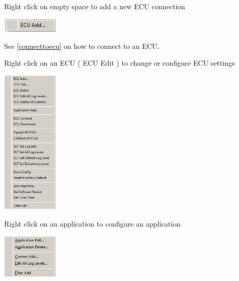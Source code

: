 \documentclass[a4paper,11pt]{article}
\begin{document}
\vspace{0.3cm}

Right click on empty space to add a new ECU connection\linebreak

\vspace{0.1cm}

\includegraphics[width=0.2\textwidth]{images/ecu_add.png}\linebreak

\vspace{0.1cm} See \autoref{connecttoecu} on how to connect to an ECU.\linebreak

\vspace{0.3cm}

Right click on an ECU ( ECU Edit ) to change or configure ECU settings\linebreak

\vspace{0.1cm}

\includegraphics[width=0.2\textwidth]{images/ecu_context_menu.png}

\vspace{0.1cm}

Right click on an application to configure an application

\vspace{0.1cm}

\includegraphics[width=0.2\textwidth]{images/app_context_menu.png}
\end{document}
